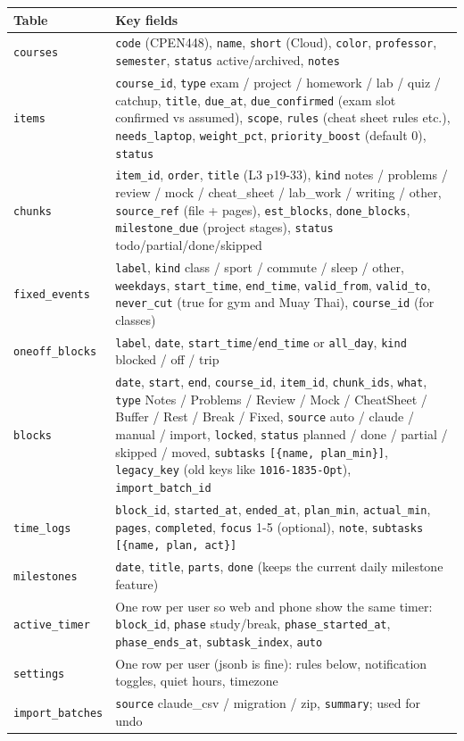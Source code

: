 \documentclass[11pt,a4paper]{article}
\newcommand{\code}[1]{\texttt{\small #1}}
\begin{document}
\begin{longtable}{L{2.9cm}L{12.6cm}}
\toprule
\textbf{Table} & \textbf{Key fields} \\
\midrule
\endhead
\code{courses} & \code{code} (CPEN448), \code{name}, \code{short} (Cloud), \code{color}, \code{professor}, \code{semester}, \code{status} active/archived, \code{notes} \\
\code{items} & \code{course\_id}, \code{type} exam / project / homework / lab / quiz / catchup, \code{title}, \code{due\_at}, \code{due\_confirmed} (exam slot confirmed vs assumed), \code{scope}, \code{rules} (cheat sheet rules etc.), \code{needs\_laptop}, \code{weight\_pct}, \code{priority\_boost} (default 0), \code{status} \\
\code{chunks} & \code{item\_id}, \code{order}, \code{title} (L3 p19-33), \code{kind} notes / problems / review / mock / cheat\_sheet / lab\_work / writing / other, \code{source\_ref} (file + pages), \code{est\_blocks}, \code{done\_blocks}, \code{milestone\_due} (project stages), \code{status} todo/partial/done/skipped \\
\code{fixed\_events} & \code{label}, \code{kind} class / sport / commute / sleep / other, \code{weekdays}, \code{start\_time}, \code{end\_time}, \code{valid\_from}, \code{valid\_to}, \code{never\_cut} (true for gym and Muay Thai), \code{course\_id} (for classes) \\
\code{oneoff\_blocks} & \code{label}, \code{date}, \code{start\_time}/\code{end\_time} or \code{all\_day}, \code{kind} blocked / off / trip \\
\code{blocks} & \code{date}, \code{start}, \code{end}, \code{course\_id}, \code{item\_id}, \code{chunk\_ids}, \code{what}, \code{type} Notes / Problems / Review / Mock / CheatSheet / Buffer / Rest / Break / Fixed, \code{source} auto / claude / manual / import, \code{locked}, \code{status} planned / done / partial / skipped / moved, \code{subtasks} \code{[\{name, plan\_min\}]}, \code{legacy\_key} (old keys like \code{1016-1835-Opt}), \code{import\_batch\_id} \\
\code{time\_logs} & \code{block\_id}, \code{started\_at}, \code{ended\_at}, \code{plan\_min}, \code{actual\_min}, \code{pages}, \code{completed}, \code{focus} 1-5 (optional), \code{note}, \code{subtasks} \code{[\{name, plan, act\}]} \\
\code{milestones} & \code{date}, \code{title}, \code{parts}, \code{done} (keeps the current daily milestone feature) \\
\code{active\_timer} & One row per user so web and phone show the same timer: \code{block\_id}, \code{phase} study/break, \code{phase\_started\_at}, \code{phase\_ends\_at}, \code{subtask\_index}, \code{auto} \\
\code{settings} & One row per user (jsonb is fine): rules below, notification toggles, quiet hours, timezone \\
\code{import\_batches} & \code{source} claude\_csv / migration / zip, \code{summary}; used for undo \\
\bottomrule
\end{longtable}
\end{document}
